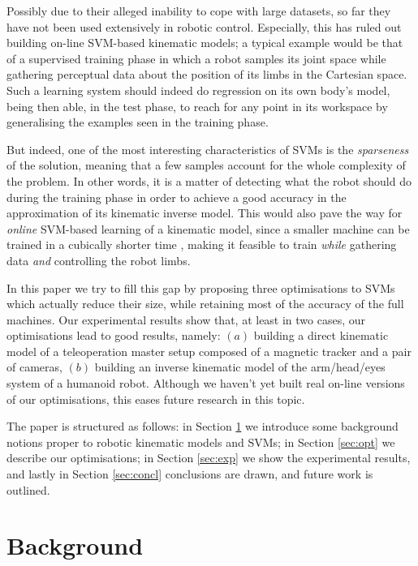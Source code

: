 \documentclass[conference]{IEEEtran}
\begin{document}
Possibly due to their alleged inability to cope with large datasets,
so far they have not been used extensively in robotic
control. Especially, this has ruled out building on-line SVM-based
kinematic models; a typical example would be that of a supervised
training phase in which a robot samples its joint space while
gathering perceptual data about the position of its limbs in the
Cartesian space. Such a learning system should indeed do regression on
its own body's model, being then able, in the test phase, to reach for
any point in its workspace by generalising the examples seen in the
training phase.

But indeed, one of the most interesting characteristics of SVMs is the
\emph{sparseness} of the solution, meaning that a few samples account
for the whole complexity of the problem. In other words, it is a
matter of detecting what the robot should do during the training phase
in order to achieve a good accuracy in the approximation of its
kinematic inverse model. This would also pave the way for
\emph{online} SVM-based learning of a kinematic model, since a smaller
machine can be trained in a cubically shorter time
\cite{KeerthiCDC06}, making it feasible to train \emph{while}
gathering data \emph{and} controlling the robot limbs.

In this paper we try to fill this gap by proposing three optimisations
to SVMs which actually reduce their size, while retaining most of the
accuracy of the full machines. Our experimental results show that, at
least in two cases, our optimisations lead to good results, namely:
$(a)$ building a direct kinematic model of a teleoperation master
setup composed of a magnetic tracker and a pair of cameras, $(b)$
building an inverse kinematic model of the arm/head/eyes system of a
humanoid robot. Although we haven't yet built real on-line versions of
our optimisations, this eases future research in this topic.

The paper is structured as follows: in Section \ref{sec:bg} we
introduce some background notions proper to robotic kinematic models
and SVMs; in Section \ref{sec:opt} we describe our optimisations; in
Section \ref{sec:exp} we show the experimental results, and lastly in
Section \ref{sec:concl} conclusions are drawn, and future work is
outlined.

\section{Background}
\label{sec:bg}
\end{document}
